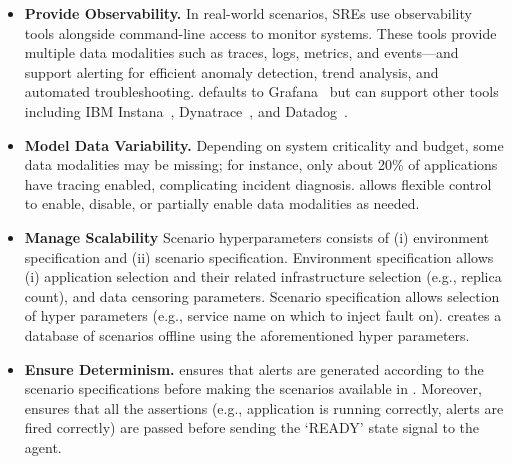 \begin{itemize}[left=0pt, topsep=0pt, partopsep=0pt, itemsep=0pt, parsep=0pt]
    \item \textbf{Provide Observability.} 
    In real-world scenarios, SREs use observability tools alongside command-line access to monitor systems. These tools provide multiple data modalities such as traces, logs, metrics, and events—and support alerting for efficient anomaly detection, trend analysis, and automated troubleshooting. 
    \bench defaults to Grafana~\cite{grafana} but can support other tools including IBM Instana~\cite{instana}, Dynatrace~\cite{dynatrace}, and Datadog~\cite{datadog}. 
    \item \textbf{Model Data Variability.} 
    Depending on system criticality and budget, some data modalities may be missing; for instance, only about 20\% of applications have tracing enabled, complicating incident diagnosis. 
    \bench allows flexible control to enable, disable, or partially enable data modalities as needed.
    \item \textbf{{Manage} Scalability} Scenario hyperparameters consists of (i) environment specification and (ii) scenario specification. 
    Environment specification allows (i) application selection and their related infrastructure selection (e.g., replica count), and data censoring parameters.
    Scenario specification allows selection of hyper parameters (e.g., service name on which to inject fault on). 
    \bench creates a database of scenarios offline using the aforementioned hyper parameters.
    \item \textbf{{Ensure} Determinism.} \bench ensures that alerts are generated according to the scenario specifications before making the scenarios available in \bench. Moreover, \bench ensures that all the assertions (e.g., application is running correctly, alerts are fired correctly) are passed before sending the `READY' state signal to the agent.  
\end{itemize}




